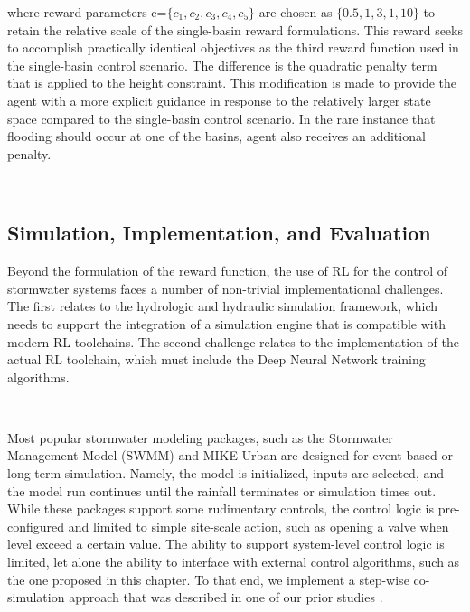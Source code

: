 where reward parameters  c=$\{c_1,c_2,c_3,c_4,c_5\}$ are chosen as $\{0.5,1,3,1,10\}$ to retain the relative scale of the single-basin reward formulations.
This reward seeks to accomplish practically identical objectives as the third reward function used in the single-basin control scenario.
The difference is the quadratic penalty term that is applied to the height constraint.
This modification is made to provide the agent with a more explicit guidance in response to the relatively larger state space compared to the single-basin control scenario.
In the rare instance that flooding should occur at one of the basins, agent also receives an additional penalty.

\

\subsection{Simulation, Implementation, and Evaluation}
Beyond the formulation of the reward function, the use of RL for the control of stormwater systems faces a number of non-trivial implementational challenges.
The first relates to the hydrologic and hydraulic simulation framework, which needs to support the integration of a simulation engine that is compatible with modern RL toolchains.
The second challenge relates to the implementation of the actual RL toolchain, which must include the Deep Neural Network training algorithms.

\

Most popular stormwater modeling packages, such as the Stormwater Management Model (SWMM) \cite{Rossman2010Storm5.1} and MIKE Urban \cite{Elliott2007ADrainage} are designed for event based or long-term simulation.
Namely, the model is initialized, inputs are selected, and the model run continues until the rainfall terminates or simulation times out.
While these packages support some rudimentary controls, the control logic is pre-configured and limited to simple site-scale action, such as opening a valve when level exceed a certain value.
The ability to support system-level control logic is limited, let alone the ability to interface with external control algorithms, such as the one proposed in this chapter.
To that end, we implement a step-wise co-simulation approach that was described in one of our prior studies \cite{Mullapudi_Wong_Kerkez_2017}.

\

